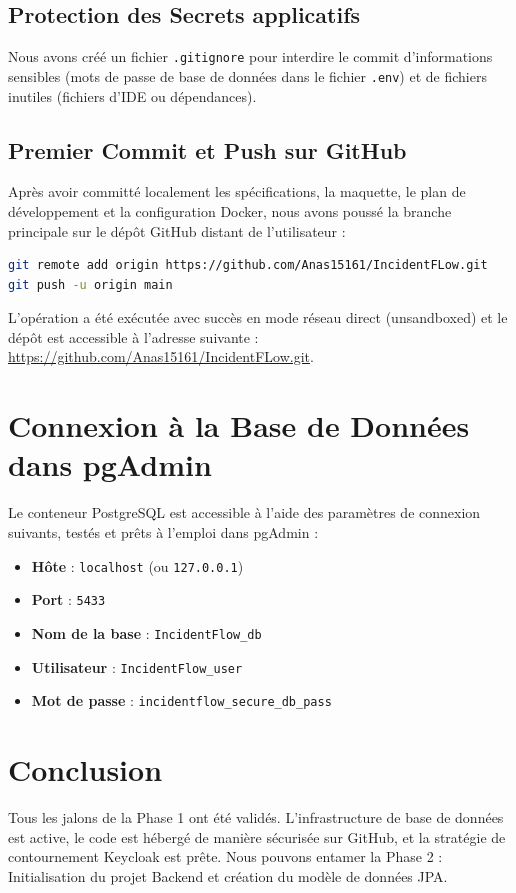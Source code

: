 \documentclass[12pt,a4paper]{article}
\begin{document}
\subsection{Protection des Secrets applicatifs}
Nous avons créé un fichier \texttt{.gitignore} pour interdire le commit d'informations sensibles (mots de passe de base de données dans le fichier \texttt{.env}) et de fichiers inutiles (fichiers d'IDE ou dépendances).

\subsection{Premier Commit et Push sur GitHub}
Après avoir committé localement les spécifications, la maquette, le plan de développement et la configuration Docker, nous avons poussé la branche principale sur le dépôt GitHub distant de l'utilisateur :
\begin{lstlisting}[language=bash]
git remote add origin https://github.com/Anas15161/IncidentFLow.git
git push -u origin main
\end{lstlisting}
L'opération a été exécutée avec succès en mode réseau direct (unsandboxed) et le dépôt est accessible à l'adresse suivante : \url{https://github.com/Anas15161/IncidentFLow.git}.

\section{Connexion à la Base de Données dans pgAdmin}
Le conteneur PostgreSQL est accessible à l'aide des paramètres de connexion suivants, testés et prêts à l'emploi dans pgAdmin :
\begin{itemize}
    \item \textbf{Hôte} : \texttt{localhost} (ou \texttt{127.0.0.1})
    \item \textbf{Port} : \texttt{5433}
    \item \textbf{Nom de la base} : \texttt{IncidentFlow\_db}
    \item \textbf{Utilisateur} : \texttt{IncidentFlow\_user}
    \item \textbf{Mot de passe} : \texttt{incidentflow\_secure\_db\_pass}
\end{itemize}

\section{Conclusion}
Tous les jalons de la Phase 1 ont été validés. L'infrastructure de base de données est active, le code est hébergé de manière sécurisée sur GitHub, et la stratégie de contournement Keycloak est prête. Nous pouvons entamer la Phase 2 : Initialisation du projet Backend et création du modèle de données JPA.
\end{document}
